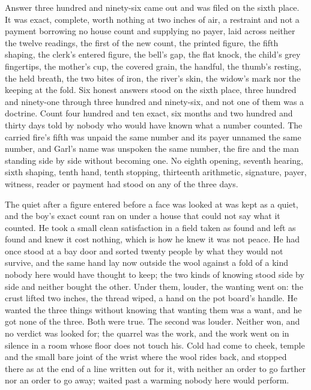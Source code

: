 Answer three hundred and ninety-six came out and was filed on the sixth place. It was exact, complete, worth nothing at two inches of air, a restraint and not a payment borrowing no house count and supplying no payer, laid across neither the twelve readings, the first of the new count, the printed figure, the fifth shaping, the clerk's entered figure, the bell's gap, the flat knock, the child's grey fingertips, the mother's cup, the covered grain, the handful, the thumb's resting, the held breath, the two bites of iron, the river's skin, the widow's mark nor the keeping at the fold. Six honest answers stood on the sixth place, three hundred and ninety-one through three hundred and ninety-six, and not one of them was a doctrine. Count four hundred and ten exact, six months and two hundred and thirty days told by nobody who would have known what a number counted. The carried fire's fifth was unpaid the same number and its payer unnamed the same number, and Garl's name was unspoken the same number, the fire and the man standing side by side without becoming one. No eighth opening, seventh hearing, sixth shaping, tenth hand, tenth stopping, thirteenth arithmetic, signature, payer, witness, reader or payment had stood on any of the three days.

The quiet after a figure entered before a face was looked at was kept as a quiet, and the boy's exact count ran on under a house that could not say what it counted. He took a small clean satisfaction in a field taken as found and left as found and knew it cost nothing, which is how he knew it was not peace. He had once stood at a bay door and sorted twenty people by what they would not survive, and the same hand lay now outside the wool against a fold of a kind nobody here would have thought to keep; the two kinds of knowing stood side by side and neither bought the other. Under them, louder, the wanting went on: the crust lifted two inches, the thread wiped, a hand on the pot board's handle. He wanted the three things without knowing that wanting them was a want, and he got none of the three. Both were true. The second was louder. Neither won, and no verdict was looked for; the quarrel was the work, and the work went on in silence in a room whose floor does not touch his. Cold had come to cheek, temple and the small bare joint of the wrist where the wool rides back, and stopped there as at the end of a line written out for it, with neither an order to go farther nor an order to go away;  waited past a warming nobody here would perform.

